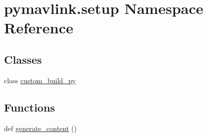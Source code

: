 \hypertarget{namespacepymavlink_1_1setup}{}\section{pymavlink.\+setup Namespace Reference}
\label{namespacepymavlink_1_1setup}
\subsection*{Classes}
\begin{DoxyCompactItemize}
\item 
class \mbox{\hyperlink{classpymavlink_1_1setup_1_1custom__build__py}{custom\+\_\+build\+\_\+py}}
\end{DoxyCompactItemize}
\subsection*{Functions}
\begin{DoxyCompactItemize}
\item 
def \mbox{\hyperlink{namespacepymavlink_1_1setup_a87d5649d7ea3c727f1b48e72d3a51c85}{generate\+\_\+content}} ()
\end{DoxyCompactItemize}
